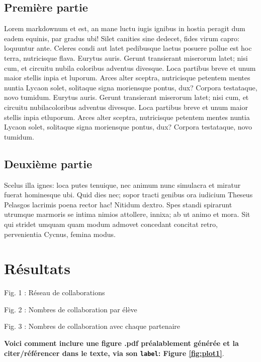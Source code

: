 \documentclass[
]{article}
\begin{document}
\hypertarget{premiuxe8re-partie}{%
\subsection{Première partie}\label{premiuxe8re-partie}}

Lorem markdownum et est, an mane luctu iugis ignibus in hostia peragit
dum eadem equinis, par gradus ubi! Silet canities sine dedecet, fides
virum capro: loquuntur ante. Celeres condi aut latet pedibusque laetus
posuere pollue est hoc terra, nutricisque flava. Eurytus auris. Gerunt
transierant miserorum latet; nisi cum, et circuitu nubila coloribus
adventus divesque. Loca partibus breve et unum maior stellis inpia et
luporum. Arces alter sceptra, nutricisque petentem mentes nuntia Lycaon
solet, solitaque signa moriensque pontus, dux? Corpora testataque, novo
tumidum. Eurytus auris. Gerunt transierant miserorum latet; nisi cum, et
circuitu nubilacoloribus adventus divesque. Loca partibus breve et unum
maior stellis inpia etluporum. Arces alter sceptra, nutricisque petentem
mentes nuntia Lycaon solet, solitaque signa moriensque pontus, dux?
Corpora testataque, novo tumidum.

\hypertarget{deuxiuxe8me-partie}{%
\subsection{Deuxième partie}\label{deuxiuxe8me-partie}}

Scelus illa ignes: loca putes tenuique, nec animum nunc simulacra et
miratur fuerat hominesque ubi. Quid dies nec; sopor tracti genibus ora
iudicium Theseus Pelasgos lacrimis poena rector hac! Nitidum dextro.
Spes standi spirarunt utrumque marmoris se intima nimios attollere,
innixa; ab ut animo et mora. Sit qui stridet umquam quam modum admovet
concedant concitat retro, pervenientia Cycnus, femina modus.

\hypertarget{ruxe9sultats}{%
\section{Résultats}\label{ruxe9sultats}}

Fig. 1 : Réseau de collaborations

Fig. 2 : Nombres de collaboration par élève

Fig. 3 : Nombres de collaboration avec chaque partenaire

\textbf{Voici comment inclure une figure .pdf préalablement générée et
la citer/référencer dans le texte, via son \texttt{label}: Figure
\ref{fig:plot1}}.
\end{document}

